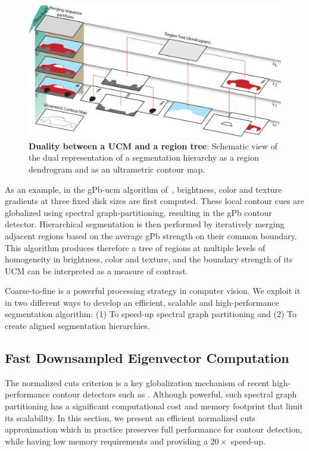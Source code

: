 \documentclass[10pt,journal,cspaper,compsoc]{IEEEtran}
\begin{document}
\begin{figure}[t]
\includegraphics[width=\linewidth]{figures/hierarchy.pdf}
\caption{\textbf{Duality between a UCM and a region tree}: Schematic view of the dual representation of a segmentation hierarchy
as a region dendrogram and as an ultrametric contour map.}
\label{fig:hierarchy}
\end{figure}

As an example, in the gPb-ucm algorithm of~\cite{Arbelaez2011}, brightness, color and texture gradients at three fixed disk sizes are first computed. 
These local contour cues are globalized using spectral graph-partitioning, resulting in the gPb contour detector. 
Hierarchical segmentation is then performed by iteratively merging adjacent regions based on the average gPb strength on their common boundary. 
This algorithm produces therefore a tree of regions at multiple levels of homogeneity in brightness, color and texture, and the boundary strength of its UCM can be interpreted as a measure of contrast. 

Coarse-to-fine is a powerful processing strategy in computer vision. 
We exploit it in two different ways to develop an efficient, scalable and high-performance segmentation algorithm: 
(1) To speed-up spectral graph partitioning and (2) To create aligned segmentation hierarchies.

\subsection{Fast Downsampled Eigenvector Computation}
\label{sec:fast_eigen}

The normalized cuts criterion is a key globalization mechanism of recent high-performance contour detectors such as \cite{Arbelaez2011, renNIPS12}.
Although powerful, such spectral graph partitioning has a significant computational cost and memory footprint that limit its scalability. 
In this section, we present an efficient normalized cuts approximation which in practice preserves full performance for contour detection, while having low memory requirements and providing a $20\times$ speed-up.
\end{document}
